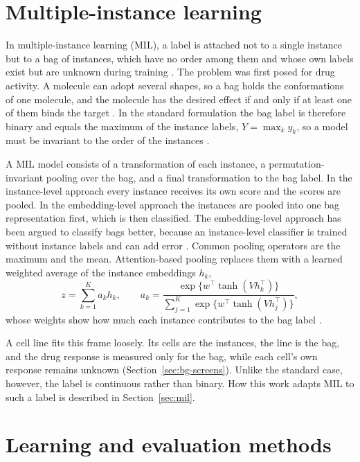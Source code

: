 \section{Multiple-instance learning}
\label{sec:bg-mil}

In multiple-instance learning (MIL), a label is attached not to a single instance but to a bag of
instances, which have no order among them and whose own labels exist but are unknown during training
\cite{ilse2018}. The problem was first posed for drug activity. A molecule can adopt several shapes, so a
bag holds the conformations of one molecule, and the molecule has the desired effect if and only if at
least one of them binds the target \cite{dietterich1997}. In the standard formulation the bag
label is therefore binary and equals the maximum of the instance labels, $Y = \max_k y_k$, so a model
must be invariant to the order of the instances \cite{ilse2018}.

A MIL model consists of a transformation of each instance, a permutation-invariant pooling over the
bag, and a final transformation to the bag label. In the instance-level approach every instance receives
its own score and the scores are pooled. In the embedding-level approach the instances are pooled into
one bag representation first, which is then classified. The embedding-level approach has been argued to
classify bags better, because an instance-level classifier is trained without instance labels and can
add error \cite{ilse2018}. Common pooling operators are the maximum and the mean. Attention-based
pooling replaces them with a learned weighted average of the instance embeddings $h_k$,
\begin{equation}
  z = \sum_{k=1}^{K} a_k h_k, \qquad
  a_k = \frac{\exp\{w^\top \tanh(V h_k^\top)\}}{\sum_{j=1}^{K} \exp\{w^\top \tanh(V h_j^\top)\}},
  \label{eq:attention-mil}
\end{equation}
whose weights show how much each instance contributes to the bag label \cite{ilse2018}.

A cell line fits this frame loosely. Its cells are the instances, the line is the bag, and the drug
response is measured only for the bag, while each cell's own response remains unknown
(Section~\ref{sec:bg-screens}). Unlike the standard case, however, the label is continuous rather than
binary. How this work adapts MIL to such a label is described in Section~\ref{sec:mil}.

\section{Learning and evaluation methods}
\label{sec:bg-methods}

